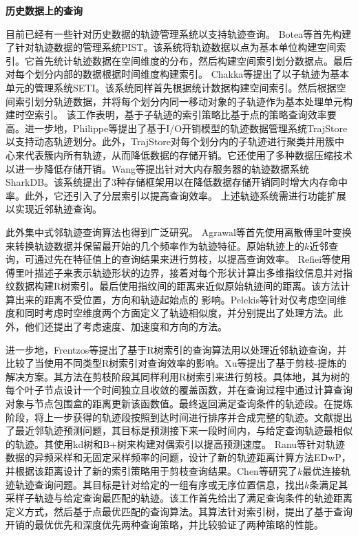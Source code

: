 \textbf{历史数据上的查询}

目前已经有一些针对历史数据的轨迹管理系统以支持轨迹查询\cite{BoteaMNS08,ChakkaEP03,Cudre-MaurouxWM10}。
Botea等首先构建了针对轨迹数据的管理系统PIST\cite{BoteaMNS08}。该系统将轨迹数据以点为基本单位构建空间索引。它首先统计轨迹数据在空间维度的分布，然后构建空间索引划分数据点。最后对每个划分内部的数据根据时间维度构建索引。
Chakka等提出了以子轨迹为基本单元的管理系统SETI\cite{ChakkaEP03}。该系统同样首先根据统计数据构建空间索引。然后根据空间索引划分轨迹数据，并将每个划分内同一移动对象的子轨迹作为基本处理单元构建时空索引。
该工作表明，基于子轨迹的索引策略比基于点的策略查询效率要高。进一步地，Philippe等提出了基于I/O开销模型的轨迹数据管理系统TrajStore以支持动态轨迹划分\cite{Cudre-MaurouxWM10}。此外，TrajStore对每个划分内的子轨迹进行聚类并用簇中心来代表簇内所有轨迹，从而降低数据的存储开销。它还使用了多种数据压缩技术以进一步降低存储开销。Wang等提出针对大内存服务器的轨迹数据系统SharkDB\cite{WangZZS15,WangZXZZS14,ZhengWZSLS18}。该系统提出了3种存储框架用以在降低数据存储开销同时增大内存命中率。此外，它还引入了分层索引以提高查询效率。
上述轨迹系统需进行功能扩展以实现近邻轨迹查询。

此外集中式邻轨迹查询算法也得到广泛研究。
Agrawal等首先使用离散傅里叶变换来转换轨迹数据并保留最开始的几个频率作为轨迹特征\cite{AgrawalFS93}。原始轨迹上的$k$近邻查询，可通过先在特征值上的查询结果来进行剪枝，以提高查询效率。
Refiei等使用傅里叶描述子来表示轨迹形状的边界，接着对每个形状计算出多维指纹信息并对指纹数据构建R树索引\cite{RafieiM02}。最后使用指纹间的距离来近似原始轨迹间的距离。该方法计算出来的距离不受位置，方向和轨迹起始点的 影响。Pelekis等针对仅考虑空间维度和同时考虑时空维度两个方面定义了轨迹相似度，并分别提出了处理方法\cite{Pelekis}。此外，他们还提出了考虑速度、加速度和方向的方法。

进一步地，Frentzos等提出了基于R树索引的查询算法用以处理近邻轨迹查询，并比较了当使用不同类型R树索引对查询效率的影响\cite{FrentzosGPT07}。Xu等提出了基于剪枝-提炼的解决方案\cite{GutingBX10}。其方法在剪枝阶段其同样利用R树索引来进行剪枝。具体地，其为树的每个叶子节点设计一个时间独立且收敛的覆盖函数，并在查询过程中通过计算查询对象与节点包围盒的距离更新该函数值。最终返回满足查询条件的轨迹段。在提炼阶段，将上一步获得的轨迹段按照到达时间进行排序并合成完整的轨迹。文献\cite{KolliosGT99}提出了最近邻轨迹预测问题，其目标是预测接下来一段时间内，与给定查询轨迹最相似的轨迹。其使用kd树和B+树来构建对偶索引以提高预测速度。
Ranu等针对轨迹数据的异频采样和无固定采样频率的问题，设计了新的轨迹距离计算方法EDwP，并根据该距离设计了新的索引策略用于剪枝查询结果\cite{RanuPTDR15}。Chen等研究了$k$最优连接轨迹轨迹查询问题\cite{ChenSZZX10}。其目标是针对给定的一组有序或无序位置信息，找出$k$条满足其采样子轨迹与给定查询最匹配的轨迹。该工作首先给出了满足查询条件的轨迹距离定义方式，然后基于点最优匹配的查询算法。其算法针对索引树，提出了基于查询开销的最优优先和深度优先两种查询策略，并比较验证了两种策略的性能。

